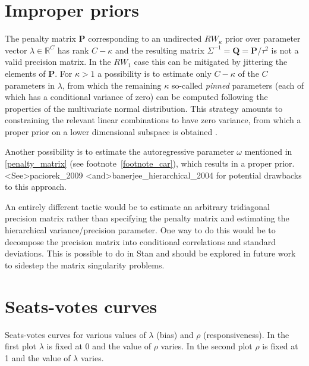 

\section[Improper priors]{Improper priors} \label{AppendixA}

The penalty matrix $\mathbf{P}$ corresponding to an undirected $RW_\kappa$ prior over 
parameter vector $\lambda \in \mathbb{R}^C$ has rank $C - \kappa$ and the resulting 
matrix $\Sigma^{-1} = \mathbf{Q} = \mathbf{P}/\tau^2$ is not a valid precision matrix. In the 
$RW_1$ case this can be mitigated by jittering the elements of $\mathbf{P}$. For $\kappa > 1$ 
a possibility is to estimate only $C - \kappa$ of the $C$ parameters in $\lambda$,  from 
which the remaining $\kappa$ so-called {\it pinned} parameters (each of which has a 
conditional variance of zero) can be computed following the properties of the multivariate 
normal distribution. This strategy amounts to  constraining the relevant linear combinations 
to have zero variance, from which a proper prior on a lower dimensional subspace is 
obtained . 

Another possibility is to estimate the autoregressive parameter $\omega$ mentioned 
in \ref{penalty_matrix} (see footnote~\ref{footnote_car}), which results in a proper prior.
\citeA<See>{paciorek_2009} \citeA<and>{banerjee_hierarchical_2004} for potential
drawbacks to this approach.

An entirely different tactic would be to estimate an arbitrary tridiagonal precision matrix 
rather than specifying the penalty matrix and estimating the hierarchical variance/precision 
parameter. One way to do this would be to decompose the precision matrix into conditional 
correlations and standard deviations. This is possible to do in Stan and should be explored 
in future work to sidestep the matrix singularity problems. 


\clearpage
\section[Seats-votes curves]{Seats-votes curves}\label{AppendixB}

Seats-votes curves for various values of $\lambda$ (bias) and $\rho$ (responsiveness). 
In the first plot $\lambda$ is fixed at 0 and the value of $\rho$ varies. In the second plot $\rho$ is fixed at 1 
and the value of $\lambda$ varies. 


